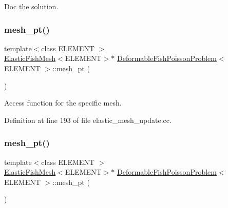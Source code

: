 Doc the solution. 

\mbox{\label{classDeformableFishPoissonProblem_a5d392625fca2a9d2848205d1e0d016a8}} 
\subsubsection{\texorpdfstring{mesh\+\_\+pt()}{mesh\_pt()}\hspace{0.1cm}{\footnotesize\ttfamily [1/2]}}
{\footnotesize\ttfamily template$<$class E\+L\+E\+M\+E\+NT $>$ \\
\hyperlink{classElasticFishMesh}{Elastic\+Fish\+Mesh}$<$E\+L\+E\+M\+E\+NT$>$$\ast$ \hyperlink{classDeformableFishPoissonProblem}{Deformable\+Fish\+Poisson\+Problem}$<$ E\+L\+E\+M\+E\+NT $>$\+::mesh\+\_\+pt (\begin{DoxyParamCaption}{ }\end{DoxyParamCaption})\hspace{0.3cm}{\ttfamily [inline]}}



Access function for the specific mesh. 



Definition at line 193 of file elastic\+\_\+mesh\+\_\+update.\+cc.

\mbox{\label{classDeformableFishPoissonProblem_a5d392625fca2a9d2848205d1e0d016a8}} 
\subsubsection{\texorpdfstring{mesh\+\_\+pt()}{mesh\_pt()}\hspace{0.1cm}{\footnotesize\ttfamily [2/2]}}
{\footnotesize\ttfamily template$<$class E\+L\+E\+M\+E\+NT $>$ \\
\hyperlink{classElasticFishMesh}{Elastic\+Fish\+Mesh}$<$E\+L\+E\+M\+E\+NT$>$$\ast$ \hyperlink{classDeformableFishPoissonProblem}{Deformable\+Fish\+Poisson\+Problem}$<$ E\+L\+E\+M\+E\+NT $>$\+::mesh\+\_\+pt (\begin{DoxyParamCaption}{ }\end{DoxyParamCaption})\hspace{0.3cm}{\ttfamily [inline]}}



